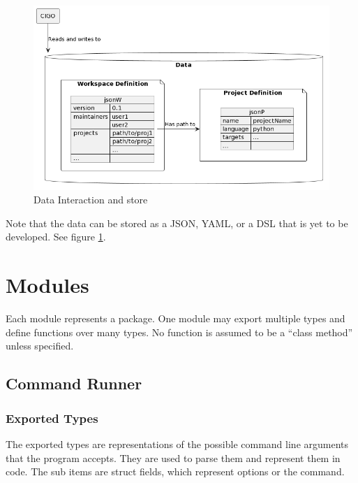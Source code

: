 \documentclass[11pt]{article}
\begin{document}
\begin{figure}[h!]
\end{figure}

\begin{figure}[h!]
  \centering
  \includegraphics[width=0.8\linewidth]{diags/system.png}
  \caption{Data Interaction and store}
  \label{fig:storage}
\end{figure}

Note that the data can be stored as a JSON, YAML, or a DSL that is yet to be
developed. See figure \ref{fig:storage}.


\newpage
\section{Modules}
\label{sec:modules}

Each module represents a package. One module may export multiple types and
define functions over many types. No function is assumed to be a ``class method''
unless specified.

\subsection{Command Runner}
\label{mod:command}

\subsubsection{Exported Types}

The exported types are representations of the possible command line arguments
that the program accepts. They are used to parse them and represent them in
code. The sub items are struct fields, which represent options or the command.
\end{document}
